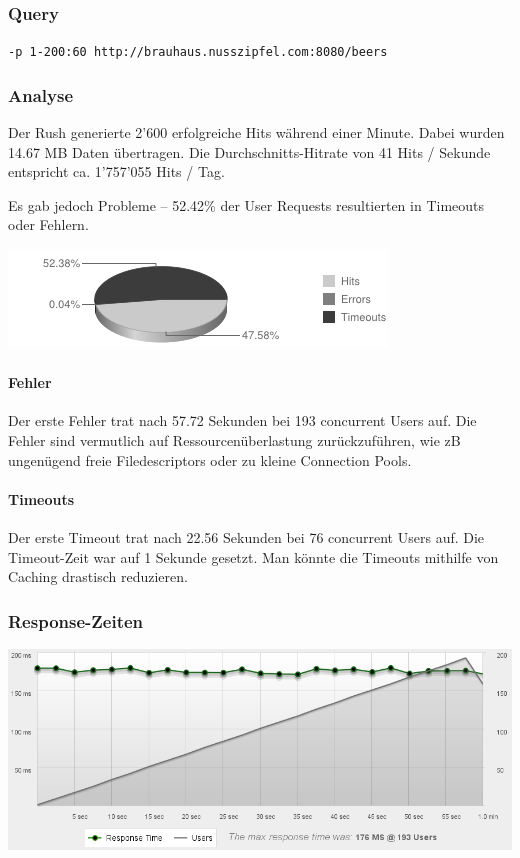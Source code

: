 \documentclass[10pt,a4paper]{scrartcl}
\begin{document}
\subsubsection*{Query}

\texttt{-p 1-200:60 http://brauhaus.nusszipfel.com:8080/beers}

\subsubsection*{Analyse}

Der Rush generierte 2'600 erfolgreiche Hits während einer Minute. Dabei wurden 14.67 MB Daten übertragen.
Die Durchschnitts-Hitrate von 41 Hits / Sekunde entspricht ca. 1'757'055 Hits / Tag.

Es gab jedoch Probleme -- 52.42\% der User Requests resultierten in Timeouts oder Fehlern.

\includegraphics[scale=1]{loadtests/chart-200.png} 

\paragraph*{Fehler}

Der erste Fehler trat nach 57.72 Sekunden bei 193 concurrent Users auf. Die Fehler sind vermutlich
auf Ressourcenüberlastung zurückzuführen, wie zB ungenügend freie Filedescriptors oder zu kleine
Connection Pools.

\paragraph*{Timeouts}

Der erste Timeout trat nach 22.56 Sekunden bei 76 concurrent Users auf. Die Timeout-Zeit war auf 1
Sekunde gesetzt. Man könnte die Timeouts mithilfe von Caching drastisch reduzieren.

\subsubsection*{Response-Zeiten}

\includegraphics[width=\textwidth]{loadtests/responsetimes-200.png} 
\end{document}
